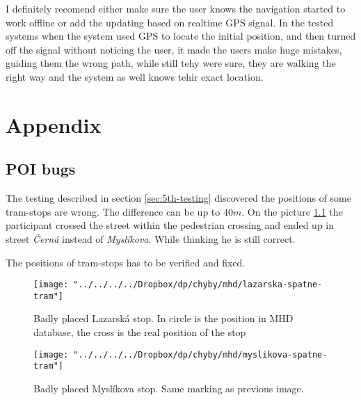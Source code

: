 \documentclass[11pt,oneside,a4paper]{book}
\begin{document}
			I definitely recomend either make sure the user knows the navigation started to work offline or add the updating based on realtime GPS signal. In the tested systems when the system used GPS to locate the initial position, and then turned off the signal without noticing the user, it made the users make huge mistakes, guiding them the wrong path, while still tehy were sure, they are walking the right way and the system as well knows tehir exact location.
		
	
	\chapter{Appendix}
		\section{POI bugs}
			The testing described in section \ref{sec:5th-testing} discovered the positions of some tram-stops are wrong. The difference can be up to $40m$. On the picture \ref{fig:myslikova-spatne-tram} the participant crossed the street within the pedestrian crossing and ended up in street \emph{Černá} instead of \emph{Myslíkova}. While thinking he is still correct.
			
			The positions of tram-stops has to be verified and fixed.
			\begin{figure}[!htb]
				\texttt{[image: "../../../../Dropbox/dp/chyby/mhd/lazarska-spatne-tram"]}
				\caption{Badly placed Lazarská stop. In circle is the position in MHD database, the cross is the real position of the stop}\label{fig:awesome_image1}
				\endminipage\hfill
				\texttt{[image: "../../../../Dropbox/dp/chyby/mhd/myslikova-spatne-tram"]}
				\caption{Badly placed Myslíkova stop. Same marking as previous image.}\label{fig:myslikova-spatne-tram}
				\endminipage\hfill
			\end{figure}
		
		
	
	

	
	
	
	
		
	{
		\def\CS{$\cal C\kern-0.1667em\lower.5ex\hbox{$\cal S$}\kern-0.075em $}
		
	}
	
	
	
\end{document}
